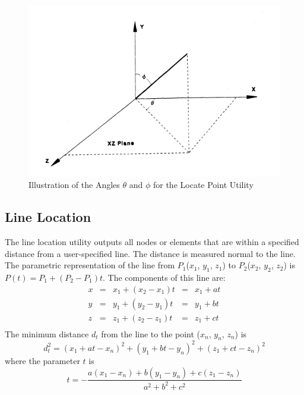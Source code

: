 \begin{figure}
\centering
\includegraphics[scale=0.65]{figures/Angles.png}
\caption{Illustration of the Angles $\theta$ and $\phi$
for the Locate Point Utility}\label{f:theta}
\end{figure}

\subsection{Line Location}\label{sec:llocate}
The line location utility outputs all nodes or elements that are within
a specified distance from a user-specified line.  The distance is
measured normal to the line.   The parametric representation of the line
from $P_1$($x_1$, $y_1$, $z_1$) to $P_2$($x_2$, $y_2$, $z_2$) is $P(t) =
P_1 + (P_2 - P_1)t$.  The components of this line are:
\begin{equation}
\begin{array}{ccccc}
x &=& x_1 + (x_2 - x_1) t &=& x_1 + at   \\
y &=& y_1 + (y_2 - y_1) t &=& y_1 + bt   \\
z &=& z_1 + (z_2 - z_1) t &=& z_1 + ct   \\
\end{array}
\end{equation}
The minimum distance $d_t$ from the line to the point ($x_n$, $y_n$, $z_n$)
is
\begin{equation}
d_t^2 = (x_1+at-x_n)^2 +(y_1+bt-y_n)^2 +(z_1+ct-z_n)^2
\end{equation}
where the parameter $t$ is
\begin{equation}
t = -\frac{a(x_1-x_n) + b(y_1-y_n) +
c(z_1-z_n)}{a^2+b^2+c^2}\label{parametric}
\end{equation}

